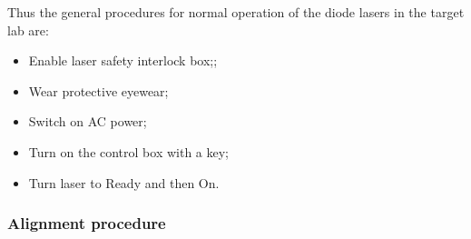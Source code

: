 {Thus the general procedures for normal operation of the diode lasers in the target lab are:

\begin {itemize}
\item Enable laser safety interlock box;;
\item Wear protective eyewear;
\item Switch on AC power;
\item Turn on the control box with a key; 
\item Turn laser to Ready and then On.
\end {itemize}

\subsubsection{Alignment procedure}

}
